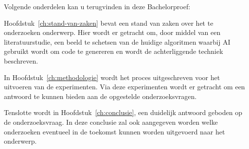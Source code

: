 Volgende onderdelen kan u terugvinden in deze Bachelorproef:

Hoofdstuk~\ref{ch:stand-van-zaken} bevat een stand van zaken over het te onderzoeken onderwerp. Hier wordt er getracht om, door middel van een literatuurstudie, een beeld te schetsen van de huidige algoritmen waarbij AI gebruikt wordt om code te genereren en wordt de achterliggende techniek beschreven.

In Hoofdstuk~\ref{ch:methodologie} wordt het proces uitgeschreven voor het uitvoeren van de experimenten. Via deze experimenten wordt er getracht om een antwoord te kunnen bieden aan de opgestelde onderzoeksvragen.

Tenslotte wordt in Hoofdstuk~\ref{ch:conclusie}, een duidelijk antwoord geboden op de onderzoeksvraag. In deze conclusie zal ook aangegeven worden welke onderzoeken eventueel in de toekomst kunnen worden uitgevoerd naar het onderwerp.